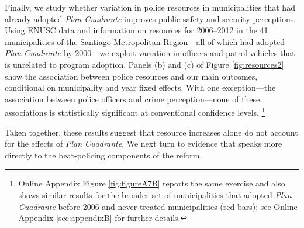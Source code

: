 Finally, we study whether variation in police resources in municipalities that had already adopted \emph{Plan Cuadrante} improves public safety and security perceptions. Using ENUSC data and information on resources for 2006--2012 in the 41 municipalities of the Santiago Metropolitan Region---all of which had adopted \emph{Plan Cuadrante} by 2000---we exploit variation in officers and patrol vehicles that is unrelated to program adoption. Panels (b) and (c) of Figure \ref{fig:resources2} show the association between police resources and our main outcomes, conditional on municipality and year fixed effects. With one exception---the association between police officers and crime perception---none of these associations is statistically significant at conventional confidence levels. \footnote{Online Appendix Figure \ref{fig:figureA7B} reports the same exercise and also shows similar results for the broader set of municipalities that adopted \emph{Plan Cuadrante} before 2006 and never-treated municipalities (red bars); see Online Appendix \ref{sec:appendixB} for further details.}

Taken together, these results suggest that resource increases alone do not account for the effects of \emph{Plan Cuadrante}. We next turn to evidence that speaks more directly to the beat-policing components of the reform.

